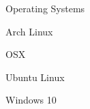 \begin{skillset}{Operating Systems}
  \item Arch Linux
  \item OSX
  \item Ubuntu Linux
  \item Windows 10
\end{skillset}
